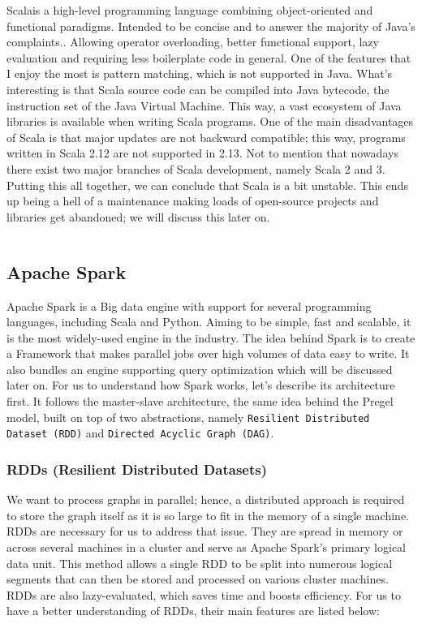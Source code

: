 Scala\footnotemark is a high-level programming language combining object-oriented and functional paradigms. Intended to be concise and to answer the majority of Java's complaints.\footnotemark. Allowing operator overloading, better functional support, lazy evaluation and requiring less boilerplate code in general. One of the features that I enjoy the most is pattern matching, which is not supported in Java. What's interesting is that Scala source code can be compiled into Java bytecode, the instruction set of the Java Virtual Machine. This way, a vast ecosystem of Java libraries is available when writing Scala programs. One of the main disadvantages of Scala is that major updates are not backward compatible; this way, programs written in Scala 2.12 are not supported in 2.13. Not to mention that nowadays there exist two major branches of Scala development, namely Scala 2 and 3. Putting this all together, we can conclude that Scala is a bit unstable. This ends up being a hell of a maintenance making loads of open-source projects and libraries get abandoned; we will discuss this later on.

\begin{code}
    \inputminted{scala}{code/listings/7-1_helloWorld.scala}
\end{code}

\subsection{Apache Spark}

Apache Spark is a Big data engine with support for several programming languages, including Scala and Python. Aiming to be simple, fast and scalable, it is the most widely-used engine in the industry. The idea behind Spark is to create a Framework that makes parallel jobs over high volumes of data easy to write. It also bundles an engine supporting query optimization which will be discussed later on. For us to understand how Spark works, let's describe its architecture first. It follows the master-slave architecture, the same idea behind the Pregel model, built on top of two abstractions, namely \texttt{Resilient Distributed Dataset (RDD)} and \texttt{Directed Acyclic Graph (DAG)}.

\subsubsection{RDDs (Resilient Distributed Datasets)}

We want to process graphs in parallel; hence, a distributed approach is required to store the graph itself as it is so large to fit in the memory of a single machine. RDDs are necessary for us to address that issue. They are spread in memory or across several machines in a cluster and serve as Apache Spark's primary logical data unit. This method allows a single RDD to be split into numerous logical segments that can then be stored and processed on various cluster machines. RDDs are also lazy-evaluated, which saves time and boosts efficiency. For us to have a better understanding of RDDs, their main features are listed below:

